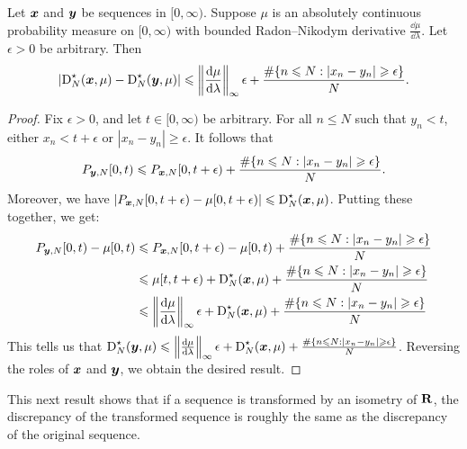 \begin{lemma}\label{lem:disc-of-two-seq}
Let ${\boldsymbol x}$ and ${\boldsymbol y}$ be sequences in $[0,\infty)$. Suppose $\mu$ is an 
absolutely continuous probability measure on $[0,\infty)$ with bounded 
Radon--Nikodym derivative $\frac{\dd \mu}{\dd\lambda}$. Let $\epsilon>0$ be 
arbitrary. Then 
\[
	\left|\operatorname{D}_N^\star({\boldsymbol x}, \mu) - \operatorname{D}_N^\star({\boldsymbol y},\mu)\right| \leqslant \left\|\frac{\mathrm{d}\mu}{\mathrm{d}\lambda}\right\|_\infty \epsilon + \frac{\#\{ n\leqslant N : |x_n - y_n| \geqslant \epsilon\}}{N} .
\]
\end{lemma}
\begin{proof}
Fix $\epsilon>0$, and let $t\in [0,\infty)$ be arbitrary. For all 
$n\leqslant N$ such that $y_n<t$, either $x_n < t+\epsilon$ or 
$|x_n - y_n| \geqslant \epsilon$. It follows that 
\[
	P_{{\boldsymbol y},N}[0,t) \leqslant P_{{\boldsymbol x},N}[0,t+\epsilon) + \frac{\#\{ n\leqslant N : |x_n - y_n| \geqslant \epsilon\}}{N} .
\]
Moreover, we have 
$\left| P_{{\boldsymbol x},N}[0,t+\epsilon) - \mu[0,t+\epsilon)\right| \leqslant \operatorname{D}_N^\star({\boldsymbol x},\mu)$. Putting these together, we get: 
\begin{align*}
	P_{{\boldsymbol y},N}[0,t) - \mu[0,t) 
		&\leqslant P_{{\boldsymbol x},N}[0,t+\epsilon) - \mu[0,t) + \frac{\#\{ n\leqslant N : |x_n - y_n| \geqslant \epsilon\}}{N} \\
		&\leqslant \mu[t,t+\epsilon) + \operatorname{D}_N^\star({\boldsymbol x},\mu) + \frac{\#\{ n\leqslant N : |x_n - y_n| \geqslant \epsilon\}}{N} \\
		&\leqslant \left\|\frac{\mathrm{d}\mu}{\mathrm{d}\lambda}\right\|_\infty \epsilon + \operatorname{D}_N^\star({\boldsymbol x},\mu) + \frac{\#\{ n\leqslant N : |x_n - y_n| \geqslant \epsilon\}}{N} 
\end{align*}
This tells us that 
$\operatorname{D}_N^\star({\boldsymbol y},\mu) \leqslant \left\|\frac{\mathrm{d}\mu}{\mathrm{d}\lambda}\right\|_\infty \epsilon + \operatorname{D}_N^\star({\boldsymbol x},\mu) + \frac{\#\{ n\leqslant N : |x_n - y_n| \geqslant \epsilon\}}{N}$. 
Reversing the roles of ${\boldsymbol x}$ and ${\boldsymbol y}$, we obtain the desired result. 
\end{proof}

This next result shows that if a sequence is transformed by an isometry of 
$\mathbf{R}$, the discrepancy of the transformed sequence is roughly the same as the 
discrepancy of the original sequence.

